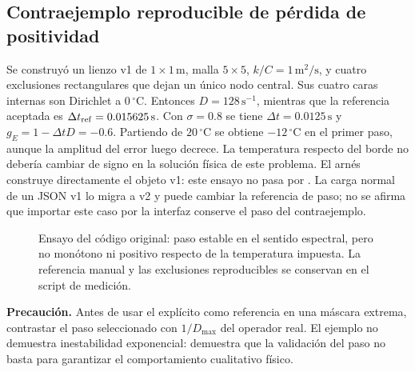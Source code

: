 \documentclass[11pt,a4paper]{article}
\newcommand{\dt}{\Delta t}
\newcommand{\code}[1]{\texttt{\detokenize{#1}}}
\newcommand{\nota}[1]{\par\smallskip\noindent\textbf{Precaución.} #1\par\smallskip}
\begin{document}
\subsection{Contraejemplo reproducible de pérdida de positividad}
\label{sec:counter}
Se construyó un lienzo v1 de $1\times1\,\mathrm{m}$, malla $5\times5$,
$k/C=1\,\mathrm{m^2/s}$, y cuatro exclusiones rectangulares que dejan un único
nodo central. Sus cuatro caras internas son Dirichlet a $0\,{}^\circ\mathrm C$.
Entonces $D=128\,\mathrm{s^{-1}}$, mientras que la referencia aceptada es
$\dt_{\rm ref}=0.015625\,\mathrm s$. Con $\sigma=0.8$ se tiene
$\dt=0.0125\,\mathrm s$ y $g_E=1-\dt D=-0.6$. Partiendo de $20\,{}^\circ\mathrm C$
se obtiene $-12\,{}^\circ\mathrm C$ en el primer paso, aunque la amplitud del
error luego decrece. La temperatura respecto del borde no debería cambiar
de signo en la solución física de este problema.
El arnés construye directamente el objeto \code{Scenario} v1: este ensayo
no pasa por \code{Scenario.load}. La carga normal de un JSON v1 lo migra
a v2 y puede cambiar la referencia de paso; no se afirma que importar este
caso por la interfaz conserve el paso del contraejemplo.

\begin{figure}[htbp]\centering
{}
\caption{Ensayo del código original: paso estable en el sentido espectral,
pero no monótono ni positivo respecto de la temperatura impuesta. La referencia
manual y las exclusiones reproducibles se conservan en el script de medición.}
\label{fig:positivity}
\end{figure}

\nota{Antes de usar el explícito como referencia en una máscara extrema,
contrastar el paso seleccionado con $1/D_{\max}$ del operador real. El ejemplo
no demuestra inestabilidad exponencial: demuestra que la validación del paso
no basta para garantizar el comportamiento cualitativo físico.}
\end{document}
